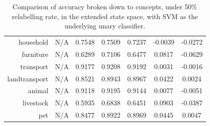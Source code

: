 \documentclass[11pt,a4paper]{book}
\begin{document}
\begin{table}[htbp]
\begin{tabular}{r|c|c|c|c|c|c}
household     & N/A    & 0.7548 & 0.7509 & 0.7237 & -0.0039 & -0.0272\\
furniture     & N/A    & 0.6289 & 0.7106 & 0.6477 & 0.0817 & -0.0629\\
transport     & N/A    & 0.9177 & 0.9208 & 0.9192 & 0.0031 & -0.0016\\
landtransport & N/A    & 0.8521 & 0.8943 & 0.8967 & 0.0422 & 0.0024\\
animal        & N/A    & 0.9118 & 0.9195 & 0.9144 & 0.0077 & -0.0051\\
livestock     & N/A    & 0.5935 & 0.6838 & 0.6451 & 0.0903 & -0.0387\\
pet           & N/A    & 0.8477 & 0.8922 & 0.8969 & 0.0445 & 0.0047
\end{tabular}
\caption{Comparison of accuracy broken down to concepts, under 50\% relabelling rate, in the extended state space, with SVM as the underlying unary classifier.}
\label{tab:svm50acc}
\end{table}
\end{document}
